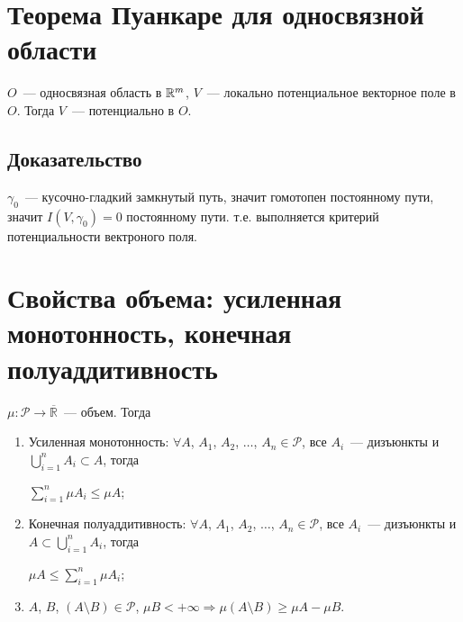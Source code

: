 \documentclass{article}
\begin{document}
    \newpage
    
    \section{Теорема Пуанкаре для односвязной области}
    
        $O$~--- односвязная область в $\mathbb{R}^m$, $V$~--- локально потенциальное векторное поле в $O$. Тогда $V$~--- потенциально в $O$.
        
        \subsection{Доказательство}
        
            $\gamma_0$~--- кусочно-гладкий замкнутый путь, значит гомотопен постоянному пути, значит $I(V, \gamma_0) = 0$ постоянному пути. т.е. выполняется критерий потенциальности вектроного поля.
            
    \newpage
    
    \section{Свойства объема: усиленная монотонность, конечная полуаддитивность}
    
        $\mu : \mathcal{P} \rightarrow \overline{\mathbb{R}}$~--- объем. Тогда
        
        \begin{enumerate}
        
            \item Усиленная монотонность: $\forall A$, $A_1$, $A_2$, $\ldots$, $A_n \in \mathcal{P}$, все $A_i$~--- дизъюнкты и $\bigcup\limits^n_{i = 1}A_i \subset A$, тогда
            
                $\sum\limits^n_{i = 1} \mu A_i \leqslant \mu A$;
                
            \item Конечная полуаддитивность: $\forall A$, $A_1$, $A_2$, $\ldots$, $A_n \in \mathcal{P}$, все $A_i$~--- дизъюнкты и $A \subset \bigcup\limits^n_{i = 1} A_i$, тогда
            
                $\mu A \leqslant \sum\limits^n_{i = 1} \mu A_i$;
                
            \item $A$, $B$, $\left( A \setminus B \right) \in \mathcal{P}$, $\mu B < +\infty \Rightarrow \mu \left( A \setminus B \right) \geqslant \mu A - \mu B$.
            
        \end{enumerate}
        
\end{document}
